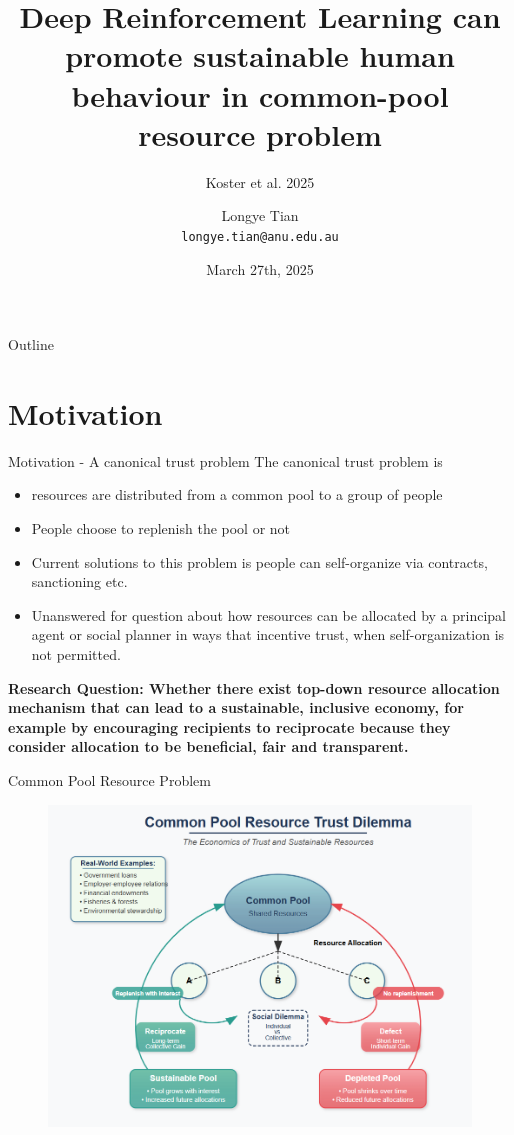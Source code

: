 \documentclass[aspectratio=169]{beamer} %
\title[DRL]{Deep Reinforcement Learning can promote sustainable human behaviour in common-pool resource problem}
\subtitle{Koster et al. 2025}
\author[Longye]{Longye Tian \\ \texttt{longye.tian@anu.edu.au}}
\institute[ANU]{Australian National University\\ School of Economics}
\date{March 27th, 2025}
\begin{document}
\begin{frame}
  \titlepage
\end{frame}

\begin{frame}{Outline}
  \tableofcontents
\end{frame}
\section{Motivation}
\begin{frame}{Motivation - A canonical trust problem}
The canonical trust problem is
\begin{itemize}
\item resources are distributed from a common pool to a group of people
\item People choose to replenish the pool or not
\item Current solutions to this problem is people can self-organize via contracts, sanctioning etc. 
\item Unanswered for question about how resources can be allocated by a principal agent or social planner in ways that incentive trust, when self-organization is not permitted.
\end{itemize}
\textbf{Research Question: Whether there exist top-down resource allocation mechanism that can lead to a sustainable, inclusive economy, for example by encouraging recipients to reciprocate because they consider allocation to be beneficial, fair and transparent.}
\end{frame}

\begin{frame}{Common Pool Resource Problem}
\begin{figure}
    \centering
    \includegraphics[width=0.6\linewidth]{Literature Reading/RL/CPR problem.png}
\end{figure}
    
\end{frame}
\end{document}
